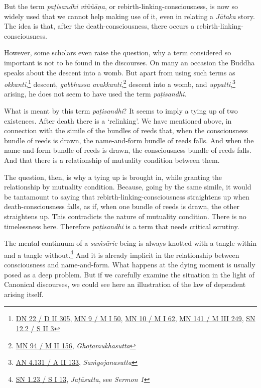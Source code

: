 But the term \emph{paṭisandhi viññāṇa}, or rebirth-linking-consciousness, is now so widely used that we cannot help making use of it, even in relating a \emph{Jātaka} story. The idea is that, after the death-consciousness, there occurs a rebirth-linking-consciousness.

However, some scholars even raise the question, why a term considered so important is not to be found in the discourses. On many an occasion the Buddha speaks about the descent into a womb. But apart from using such terms as \emph{okkanti},\footnote{\href{https://suttacentral.net/dn22/pli/ms}{DN 22 / D II 305}, \href{https://suttacentral.net/mn9/pli/ms}{MN 9 / M I 50}, \href{https://suttacentral.net/mn10/pli/ms}{MN 10 / M I 62}, \href{https://suttacentral.net/mn141/pli/ms}{MN 141 / M III 249}, \href{https://suttacentral.net/sn12.2/pli/ms}{SN 12.2 / S II 3}} descent, \emph{gabbhassa avakkanti},\footnote{\href{https://suttacentral.net/mn94/pli/ms}{MN 94 / M II 156}, \emph{Ghoṭamukhasutta}} descent into a womb, and \emph{uppatti},\footnote{\href{https://suttacentral.net/an4.131/pli/ms}{AN 4.131 / A II 133}, \emph{Saṁyojanasutta}} arising, he does not seem to have used the term \emph{paṭisandhi}.

What is meant by this term \emph{paṭisandhi}? It seems to imply a tying up of two existences. After death there is a `relinking'. We have mentioned above, in connection with the simile of the bundles of reeds that, when the consciousness bundle of reeds is drawn, the name-and-form bundle of reeds falls. And when the name-and-form bundle of reeds is drawn, the consciousness bundle of reeds falls. And that there is a relationship of mutuality condition between them.

The question, then, is why a tying up is brought in, while granting the relationship by mutuality condition. Because, going by the same simile, it would be tantamount to saying that rebirth-linking-consciousness straightens up when death-consciousness falls, as if, when one bundle of reeds is drawn, the other straightens up. This contradicts the nature of mutuality condition. There is no timelessness here. Therefore \emph{paṭisandhi} is a term that needs critical scrutiny.

The mental continuum of a \emph{saṁsāric} being is always knotted with a tangle within and a tangle without.\footnote{\href{https://suttacentral.net/sn1.23/pli/ms}{SN 1.23 / S I 13}, \emph{Jaṭāsutta}, see \emph{Sermon 1}} And it is already implicit in the relationship between consciousness and name-and-form. What happens at the dying moment is usually posed as a deep problem. But if we carefully examine the situation in the light of Canonical discourses, we could see here an illustration of the law of dependent arising itself.

